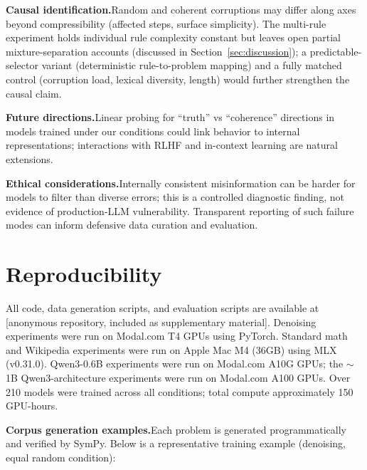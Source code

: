 \documentclass{article}
\begin{document}
\textbf{Causal identification.}\quad Random and coherent corruptions may differ along axes beyond compressibility (affected steps, surface simplicity). The multi-rule experiment holds individual rule complexity constant but leaves open partial mixture-separation accounts (discussed in Section~\ref{sec:discussion}); a predictable-selector variant (deterministic rule-to-problem mapping) and a fully matched control (corruption load, lexical diversity, length) would further strengthen the causal claim.

\textbf{Future directions.}\quad Linear probing for ``truth'' vs ``coherence'' directions in models trained under our conditions could link behavior to internal representations; interactions with RLHF and in-context learning are natural extensions.

\textbf{Ethical considerations.}\quad Internally consistent misinformation can be harder for models to filter than diverse errors; this is a controlled diagnostic finding, not evidence of production-LLM vulnerability. Transparent reporting of such failure modes can inform defensive data curation and evaluation.




\appendix

\section{Reproducibility}
\label{app:reproducibility}

All code, data generation scripts, and evaluation scripts are available at [anonymous repository, included as supplementary material]. Denoising experiments were run on Modal.com T4 GPUs using PyTorch. Standard math and Wikipedia experiments were run on Apple Mac M4 (36GB) using MLX (v0.31.0). Qwen3-0.6B experiments were run on Modal.com A10G GPUs; the ${\sim}$1B Qwen3-architecture experiments were run on Modal.com A100 GPUs. Over 210 models were trained across all conditions; total compute approximately 150 GPU-hours.

\textbf{Corpus generation examples.}\quad Each problem is generated programmatically and verified by SymPy. Below is a representative training example (denoising, equal random condition):
\end{document}
